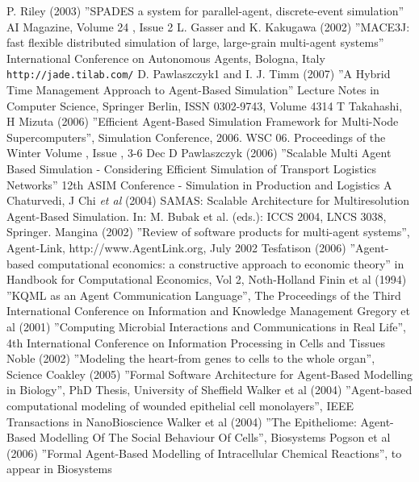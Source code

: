 
\begin{thebibliography}{99}
 P. Riley (2003) ''SPADES a system for parallel-agent, discrete-event simulation'' AI Magazine, Volume 24 ,  Issue 2
 L. Gasser and K. Kakugawa (2002) ''MACE3J: fast flexible distributed simulation of large, large-grain multi-agent systems'' International Conference on Autonomous Agents, Bologna, Italy 
 \texttt{http://jade.tilab.com/}
 D. Pawlaszczyk1 and I. J. Timm (2007) ''A Hybrid Time Management Approach to Agent-Based Simulation'' Lecture Notes in Computer Science, Springer Berlin, ISSN 0302-9743, Volume 4314
 T Takahashi, H Mizuta (2006) ''Efficient Agent-Based Simulation Framework for Multi-Node Supercomputers'', Simulation Conference, 2006. WSC 06. Proceedings of the Winter Volume , Issue , 3-6 Dec
 D Pawlaszczyk (2006) ''Scalable Multi Agent Based Simulation - Considering Efficient Simulation of Transport Logistics Networks'' 12th ASIM Conference - Simulation in Production and Logistics
  A Chaturvedi, J Chi \textsl{et al} (2004) SAMAS: Scalable Architecture for Multiresolution Agent-Based Simulation. In: M. Bubak et al. (eds.): ICCS 2004,
LNCS 3038, Springer.
 Mangina (2002) ''Review of software products for multi-agent systems'', Agent-Link, http://www.AgentLink.org, July 2002
 Tesfatison (2006) ''Agent-based computational economics: a constructive approach to economic theory'' in Handbook for Computational Economics, Vol 2, Noth-Holland
 Finin et al (1994) ''KQML as an Agent Communication Language'', The Proceedings of  the Third International Conference on Information and Knowledge Management
 Gregory et al (2001)  ''Computing Microbial Interactions and Communications in Real Life'', 4th International Conference on Information Processing in Cells and Tissues
 Noble (2002)  ''Modeling the heart-from genes to cells to the whole organ'', Science
 Coakley  (2005) ''Formal Software Architecture for Agent-Based Modelling in Biology'', PhD Thesis, University of Sheffield
 Walker et al (2004) ''Agent-based computational modeling of wounded epithelial cell monolayers'', IEEE Transactions in NanoBioscience
 Walker et al (2004) ''The Epitheliome: Agent-Based Modelling Of The Social Behaviour Of Cells'', Biosystems
 Pogson  et al (2006) ''Formal Agent-Based Modelling of Intracellular Chemical Reactions'', to appear in Biosystems

\end{thebibliography}
